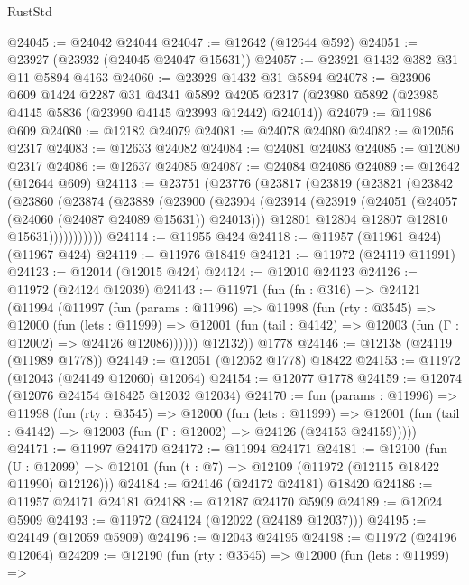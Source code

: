 \begin{lexlean}{RustStd}
\begin{coremodule}
@24045 := @24042 @24044
@24047 := @12642 (@12644 @592)
@24051 := @23927 (@23932 (@24045 @24047 @15631))
@24057 := @23921 @1432 @382 @31 @11 @5894 @4163
@24060 := @23929 @1432 @31 @5894
@24078 := @23906
    @609
    @1424
    @2287
    @31
    @4341
    @5892
    @4205
    @2317
    (@23980 @5892 (@23985 @4145 @5836 (@23990 @4145 @23993 @12442) @24014))
@24079 := @11986 @609
@24080 := @12182 @24079
@24081 := @24078 @24080
@24082 := @12056 @2317
@24083 := @12633 @24082
@24084 := @24081 @24083
@24085 := @12080 @2317
@24086 := @12637 @24085
@24087 := @24084 @24086
@24089 := @12642 (@12644 @609)
@24113 := @23751
    (@23776
      (@23817
        (@23819
          (@23821
            (@23842
              (@23860
                (@23874
                  (@23889
                    (@23900
                      (@23904
                        (@23914
                          (@23919 (@24051 (@24057 (@24060 (@24087 @24089 @15631)) @24013)))
                          @12801
                          @12804
                          @12807
                          @12810
                          @15631)))))))))))
@24114 := @11955 @424
@24118 := @11957 (@11961 @424) (@11967 @424)
@24119 := @11976 @18419
@24121 := @11972 (@24119 @11991)
@24123 := @12014 (@12015 @424)
@24124 := @12010 @24123
@24126 := @11972 (@24124 @12039)
@24143 := @11971
    (fun (fn : @316) =>
    @24121
      (@11994
        (@11997
          (fun (params : @11996) =>
          @11998
            (fun (rty : @3545) =>
            @12000
              (fun (lets : @11999) =>
              @12001 (fun (tail : @4142) => @12003 (fun (Γ : @12002) => @24126 @12086))))))
        @12132))
    @1778
@24146 := @12138 (@24119 (@11989 @1778))
@24149 := @12051 (@12052 @1778) @18422
@24153 := @11972 (@12043 (@24149 @12060) @12064)
@24154 := @12077 @1778
@24159 := @12074 (@12076 @24154 @18425 @12032 @12034)
@24170 := fun (params : @11996) =>
  @11998
    (fun (rty : @3545) =>
    @12000
      (fun (lets : @11999) =>
      @12001 (fun (tail : @4142) => @12003 (fun (Γ : @12002) => @24126 (@24153 @24159)))))
@24171 := @11997 @24170
@24172 := @11994 @24171
@24181 := @12100
    (fun (U : @12099) => @12101 (fun (t : @7) => @12109 (@11972 (@12115 @18422 @11990) @12126)))
@24184 := @24146 (@24172 @24181) @18420
@24186 := @11957 @24171 @24181
@24188 := @12187 @24170 @5909
@24189 := @12024 @5909
@24193 := @11972 (@24124 (@12022 (@24189 @12037)))
@24195 := @24149 (@12059 @5909)
@24196 := @12043 @24195
@24198 := @11972 (@24196 @12064)
@24209 := @12190
    (fun (rty : @3545) =>
    @12000
      (fun (lets : @11999) =>

\end{coremodule}
\end{lexlean}
